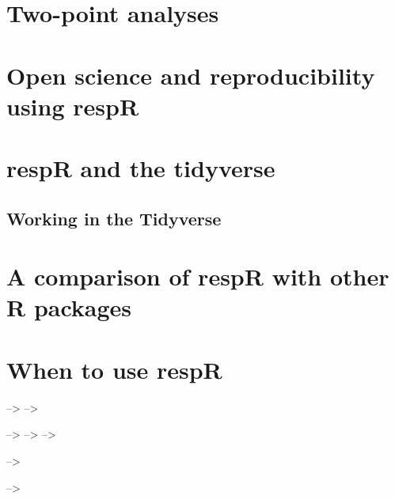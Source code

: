 \documentclass[]{book}
\begin{document}
\chapter{Two-point analyses}\label{two-point-analyses}

\chapter{Open science and reproducibility using
respR}\label{open-science-and-reproducibility-using-respr}

\chapter{respR and the tidyverse}\label{respr-and-the-tidyverse}

\section{Working in the Tidyverse}\label{working-in-the-tidyverse}

\chapter{A comparison of respR with other R
packages}\label{a-comparison-of-respr-with-other-r-packages}

\chapter{When to use respR}\label{when-to-use-respr}

--\textgreater{} --\textgreater{}

--\textgreater{} --\textgreater{} --\textgreater{}

--\textgreater{}

--\textgreater{}


\end{document}
